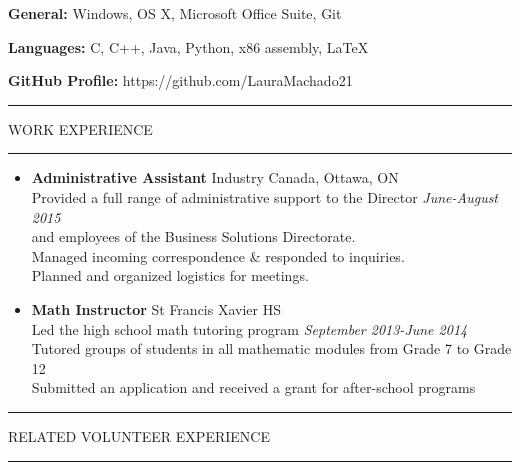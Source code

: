 \documentclass[letterpaper]{article}
\newenvironment{indentsection}[1]{\begin{list}{}%
{\setlength{\leftmargin}{#1}}%
\item[]
}{\end{list}}
\begin{document}
\begin{indentsection}{8mm}
\begin{description}
\item \textbf{General:}
\textrm{Windows, OS X, Microsoft Office Suite, Git}

\item \textbf{Languages:}
\textrm{C, C++, Java, Python, x86 assembly, \LaTeX }

\item \textbf{GitHub Profile:}
\textrm{https://github.com/LauraMachado21}

\end{description}
\end{indentsection}

\begin{center}
\vspace{2mm}
\hrule
\vspace{2mm}
\textsc{WORK EXPERIENCE}
\vspace{2mm}
\hrule
\vspace{2mm}
\end{center}

\begin{itemize}
\item \textbf{Administrative Assistant} \hfill \textrm{Industry Canada, Ottawa, ON}\\
\textrm{Provided a full range of administrative support to the Director \hfill \emph{June-August 2015} \\ and employees of the Business Solutions Directorate.\\}
\textrm{Managed incoming correspondence \& responded to inquiries. \\ Planned and organized logistics for meetings.}

\item \textbf{Math Instructor} \hfill \textrm{St Francis Xavier HS}\\
\textrm{Led the high school math tutoring program} \hfill \emph{September 2013-June 2014}\\
\textrm{Tutored groups of students in all mathematic modules from Grade 7 to Grade 12}\\
\textrm{Submitted an application and received a grant for after-school programs}

\end{itemize}

\begin{center}
\vspace{2mm}
\hrule
\vspace{2mm}
\textsc{RELATED VOLUNTEER EXPERIENCE}
\vspace{2mm}
\hrule
\vspace{2mm}
\end{center}
\end{document}
